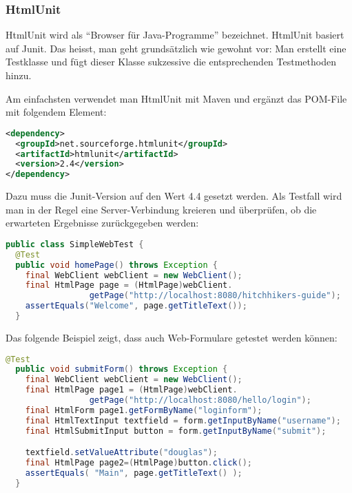 \subsubsection{HtmlUnit}
HtmlUnit wird als ``Browser für Java-Programme'' bezeichnet.
HtmlUnit basiert auf Junit. Das heisst, man geht grundsätzlich wie gewohnt vor:
Man erstellt eine Testklasse und fügt
 dieser Klasse
 sukzessive die entsprechenden Testmethoden hinzu. 

\newslide
Am einfachsten verwendet man 
HtmlUnit mit Maven und ergänzt das POM-File mit folgendem Element:
\begin{lstlisting}[language=xml,
   morekeywords={dependency,groupId,artifactId,version,scope}]
<dependency>
  <groupId>net.sourceforge.htmlunit</groupId>
  <artifactId>htmlunit</artifactId>
  <version>2.4</version>
</dependency>
\end{lstlisting}
Dazu muss die Junit-Version auf den Wert 4.4 gesetzt werden.
\newslide
Als Testfall 
wird man in der Regel eine Server-Verbindung kreieren und überprüfen, ob die
erwarteten Ergebnisse zurückgegeben werden:
\begin{lstlisting}[language=java]
public class SimpleWebTest {
  @Test
  public void homePage() throws Exception {
    final WebClient webClient = new WebClient();
    final HtmlPage page = (HtmlPage)webClient.
                 getPage("http://localhost:8080/hitchhikers-guide");
    assertEquals("Welcome", page.getTitleText());
  }
\end{lstlisting}
\newslide
Das folgende Beispiel zeigt, dass auch Web-Formulare getestet werden können:
\begin{lstlisting}[language=java]
  @Test
  public void submitForm() throws Exception {
    final WebClient webClient = new WebClient();
    final HtmlPage page1 = (HtmlPage)webClient.
                 getPage("http://localhost:8080/hello/login");
    final HtmlForm page1.getFormByName("loginform");
    final HtmlTextInput textfield = form.getInputByName("username");
    final HtmlSubmitInput button = form.getInputByName("submit");

    textfield.setValueAttribute("douglas");
    final HtmlPage page2=(HtmlPage)button.click();
    assertEquals( "Main", page.getTitleText() );
  }
\end{lstlisting}
